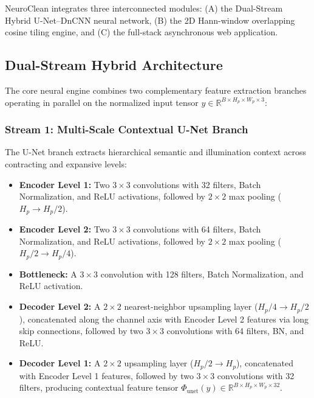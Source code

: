 \documentclass{ieeeaccess}
\begin{document}
NeuroClean integrates three interconnected modules: (A) the Dual-Stream Hybrid U-Net--DnCNN neural network, (B) the 2D Hann-window overlapping cosine tiling engine, and (C) the full-stack asynchronous web application.

\subsection{Dual-Stream Hybrid Architecture}
The core neural engine combines two complementary feature extraction branches operating in parallel on the normalized input tensor $y \in \mathbb{R}^{B \times H_p \times W_p \times 3}$:

\subsubsection{Stream 1: Multi-Scale Contextual U-Net Branch}
The U-Net branch extracts hierarchical semantic and illumination context across contracting and expansive levels:
\begin{itemize}
    \item \textbf{Encoder Level 1:} Two $3 \times 3$ convolutions with 32 filters, Batch Normalization, and ReLU activations, followed by $2 \times 2$ max pooling ($H_p \to H_p/2$).
    \item \textbf{Encoder Level 2:} Two $3 \times 3$ convolutions with 64 filters, Batch Normalization, and ReLU activations, followed by $2 \times 2$ max pooling ($H_p/2 \to H_p/4$).
    \item \textbf{Bottleneck:} A $3 \times 3$ convolution with 128 filters, Batch Normalization, and ReLU activation.
    \item \textbf{Decoder Level 2:} A $2 \times 2$ nearest-neighbor upsampling layer ($H_p/4 \to H_p/2$), concatenated along the channel axis with Encoder Level 2 features via long skip connections, followed by two $3 \times 3$ convolutions with 64 filters, BN, and ReLU.
    \item \textbf{Decoder Level 1:} A $2 \times 2$ upsampling layer ($H_p/2 \to H_p$), concatenated with Encoder Level 1 features, followed by two $3 \times 3$ convolutions with 32 filters, producing contextual feature tensor $\Phi_{\text{unet}}(y) \in \mathbb{R}^{B \times H_p \times W_p \times 32}$.
\end{itemize}
\end{document}
